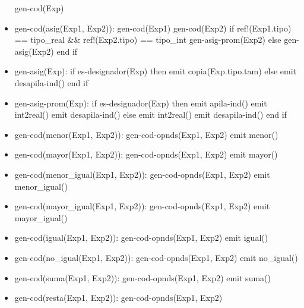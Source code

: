 \documentclass[11pt]{article}
\begin{document}
\begin{itemize}
                \subitem gen-cod(Exp)
            \item gen-cod(asig(Exp1, Exp2)): 
                \subitem gen-cod(Exp1)
                \subitem gen-cod(Exp2)
                \subitem if ref!(Exp1.tipo) == tipo\_real \&\& ref!(Exp2.tipo) == tipo\_int
                    \subsubitem gen-asig-prom(Exp2)
                \subitem else
                    \subsubitem gen-asig(Exp2)
                \subitem end if
            \item gen-asig(Exp): 
                \subitem if es-designador(Exp) then
                    \subsubitem emit copia(Exp.tipo.tam)
                \subitem else
                    \subsubitem emit desapila-ind()
                \subsubitem end if
            \item gen-asig-prom(Exp): 
                \subitem if es-designador(Exp) then
                    \subsubitem emit apila-ind()
                    \subsubitem emit int2real()
                    \subsubitem emit desapila-ind()
                \subitem else
                    \subsubitem emit int2real()
                    \subsubitem emit desapila-ind()
                \subitem end if
            \item gen-cod(menor(Exp1, Exp2)): 
                \subitem gen-cod-opnds(Exp1, Exp2)
                \subitem emit menor()
            \item gen-cod(mayor(Exp1, Exp2)): 
                \subitem gen-cod-opnds(Exp1, Exp2)
                \subitem emit mayor()
            \item gen-cod(menor\_igual(Exp1, Exp2)): 
                \subitem gen-cod-opnds(Exp1, Exp2)
                \subitem emit menor\_igual()
            \item gen-cod(mayor\_igual(Exp1, Exp2)): 
                \subitem gen-cod-opnds(Exp1, Exp2)
                \subitem emit mayor\_igual()
            \item gen-cod(igual(Exp1, Exp2)): 
                \subitem gen-cod-opnds(Exp1, Exp2)
                \subitem emit igual()
            \item gen-cod(no\_igual(Exp1, Exp2)): 
                \subitem gen-cod-opnds(Exp1, Exp2)
                \subitem emit no\_igual()
            \item gen-cod(suma(Exp1, Exp2)): 
                \subitem gen-cod-opnds(Exp1, Exp2)
                \subitem emit suma()
            \item gen-cod(resta(Exp1, Exp2)): 
                \subitem gen-cod-opnds(Exp1, Exp2)

\end{itemize}
\end{document}
